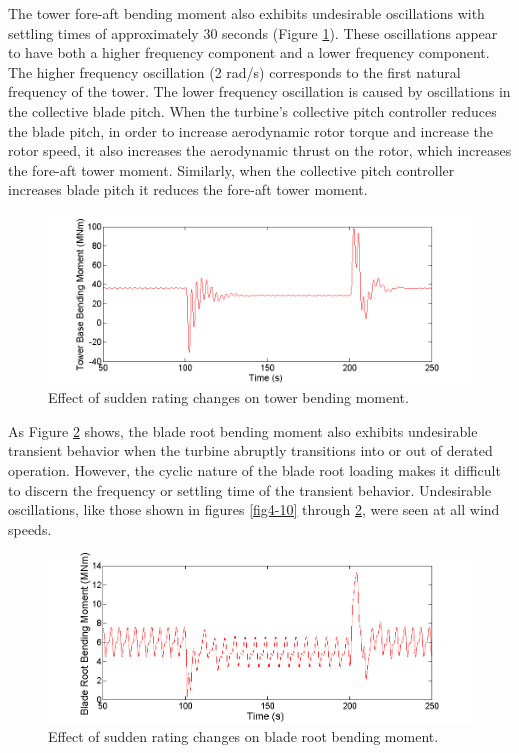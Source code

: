 The tower fore-aft bending moment also exhibits undesirable oscillations with settling times of approximately 30 seconds (Figure \ref{fig4-11}). These oscillations appear to have both a higher frequency component and a lower frequency component. The higher frequency oscillation (2 rad/s) corresponds to the first natural frequency of the tower. The lower frequency oscillation is caused by oscillations in the collective blade pitch. When the turbine's collective pitch controller reduces the blade pitch, in order to increase aerodynamic rotor torque and increase the rotor speed, it also increases the aerodynamic thrust on the rotor, which increases the fore-aft tower moment. Similarly, when the collective pitch controller increases blade pitch it reduces the fore-aft tower moment. 

\begin{figure}[htb]
	\centering
		\includegraphics[width = \linewidth]{Figures/ch4Figures/fig4-11.png}
		
	\caption{Effect of sudden rating changes on tower bending moment.}
	\label{fig4-11}
\end{figure}

As Figure \ref{fig4-12} shows, the blade root bending moment also exhibits undesirable transient behavior when the turbine abruptly transitions into or out of derated operation. However, the cyclic nature of the blade root loading makes it difficult to discern the frequency or settling time of the transient behavior. Undesirable oscillations, like those shown in figures \ref{fig4-10} through \ref{fig4-12}, were seen at all wind speeds.

\begin{figure}[htb]
	\centering
		\includegraphics[width = \linewidth]{Figures/ch4Figures/fig4-12.png}
		
	\caption{Effect of sudden rating changes on blade root bending moment.}
	\label{fig4-12}
\end{figure}

